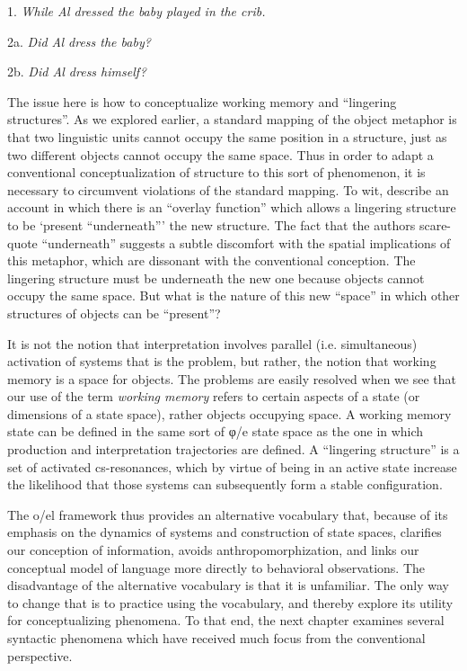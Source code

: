 1. \textit{While Al dressed the baby played in the crib.}

2a. \textit{Did Al dress the baby?}

2b. \textit{Did Al dress himself?}

The issue here is how to conceptualize working memory and “lingering structures”. As we explored earlier, a standard mapping of the object metaphor is that two linguistic units cannot occupy the same position in a structure, just as two different objects cannot occupy the same space. Thus in order to adapt a conventional conceptualization of structure to this sort of phenomenon, it is necessary to circumvent violations of the standard mapping. To wit, \citet{SlatteryEtAl2013} describe an account in which there is an “overlay function” which allows a lingering structure to be ‘present “underneath”’ the new structure. The fact that the authors scare-quote “underneath” suggests a subtle discomfort with the spatial implications of this metaphor, which are dissonant with the conventional conception. The lingering structure must be underneath the new one because objects cannot occupy the same space. But what is the nature of this new “space” in which other structures of objects can be “present”?

It is not the notion that interpretation involves parallel (i.e. simultaneous) activation of systems that is the problem, but rather, the notion that working memory is a space for objects. The problems are easily resolved when we see that our use of the term \textit{working memory} refers to certain aspects of a state (or dimensions of a state space), rather objects occupying space. A working memory state can be defined in the same sort of φ/e state space as the one in which production and interpretation trajectories are defined. A “lingering structure” is a set of activated cs-resonances, which by virtue of being in an active state increase the likelihood that those systems can subsequently form a stable configuration.

The o/el framework thus provides an alternative vocabulary that, because of its emphasis on the dynamics of systems and construction of state spaces, clarifies our conception of information, avoids anthropomorphization, and links our conceptual model of language more directly to behavioral observations. The disadvantage of the alternative vocabulary is that it is unfamiliar. The only way to change that is to practice using the vocabulary, and thereby explore its utility for conceptualizing phenomena. To that end, the next chapter examines several syntactic phenomena which have received much focus from the conventional perspective.  

